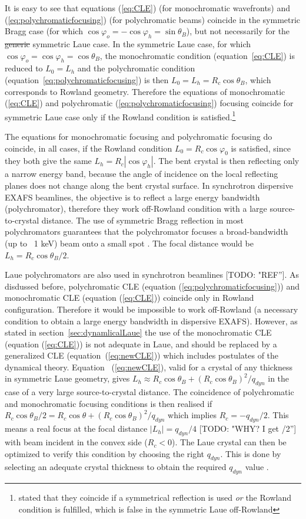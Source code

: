 \documentclass[preprint]{iucr}              %
\newcommand{\todo}[1]{{\color{red}[TODO: "#1'']}}
\newcommand{\inred}[1]{{\color{red}#1}}
\begin{document}
It is easy to see that equations (\ref{eq:CLE}) (for monochromatic wavefronts) and (\ref{eq:polychromaticfocusing}) (for polychromatic beams) coincide in the symmetric Bragg case (for which $\cos\varphi_o=-\cos\varphi_h=\sin\theta_B$), but not necessarily for the \inred{\sout{generic}} symmetric Laue case. In the symmetric Laue case, for which $\cos\varphi_o=\cos\varphi_h=\cos\theta_B$, the monochromatic condition (equation~\ref{eq:CLE}) is reduced to $L_0=L_h$ and the polychromatic condition (equation~\ref{eq:polychromaticfocusing}) is then $L_0=L_h=R_c\cos\theta_B$, which corresponds to Rowland geometry. Therefore the equations of monochromatic (\ref{eq:CLE}) and polychromatic (\ref{eq:polychromaticfocusing}) focusing coincide for symmetric Laue case only if the Rowland condition is satisfied.\footnote{\cite{CK} stated that they coincide if a symmetrical reflection is used {\it or} the Rowland condition is fulfilled, which is false in the symmetric Laue off-Rowland}

The equations for monochromatic focusing and polychromatic focusing do coincide, \inred{in all cases,} if the Rowland condition $L_0=R_c\cos\varphi_0$ is satisfied, since they both give the same $L_h=R_c|\cos\varphi_h|$. The bent crystal is then reflecting only a narrow energy band, because the angle of incidence on the local reflecting planes does not change along the bent crystal surface.
In synchrotron dispersive EXAFS beamlines, the objective is to reflect a large energy bandwidth (polychromator), therefore they work off-Rowland condition with a large source-to-crystal distance. The use of symmetric Bragg reflection in most polychromators guarantees that the polychromator focuses a broad-bandwidth (up to ~1 keV) beam onto a small spot \cite{Tolentino:ms0206}. The focal distance would be $L_h=R_c\cos\theta_B/2$.

Laue polychromators are also used in synchrotron beamlines \todo{REF}.
\inred{As disdussed before,
polychromatic CLE (equation (\ref{eq:polychromaticfocusing})) and monochromatic CLE (equation (\ref{eq:CLE})) coincide only in Rowland configuration. Therefore it would be impossible to work off-Rowland  (a necessary condition to obtain a large energy bandwidth in dispersive EXAFS). However, as stated in section~\ref{sec:dynamlicalLaue} the use of the monochromatic CLE (equation (\ref{eq:CLE})) is not adequate in Laue, and should be replaced by a generalized CLE (equation~(\ref{eq:newCLE})) which includes postulates of the dynamical theory.}
Equation ~(\ref{eq:newCLE}), valid for a crystal of any thickness in symmetric Laue geometry, gives $L_h \approx R_c \cos\theta_B + (R_c \cos\theta_B) ^2 / q_{dyn}$ in the case of a very large source-to-crystal distance. The coincidence of polychromatic and monochromatic focusing conditions is then realised if
$R_c \cos\theta_B /2 = R_c \cos\theta+ (R_c \cos\theta_B) ^2 / q_{dyn}$ which implies $R_c=-q_{dyn}/2$.
This means a real focus at the focal distance $|L_h|=q_{dyn}/4$ \todo{WHY? I get /2} with beam incident in the convex side ($R_c<0$). The Laue crystal can then be optimized to verify this condition by choosing the right $q_{dyn}$. This is done by selecting an adequate crystal thickness to obtain the required $q_{dyn}$ value \cite{Mocella2004} \cite{Mocella2008}. 
\end{document}
